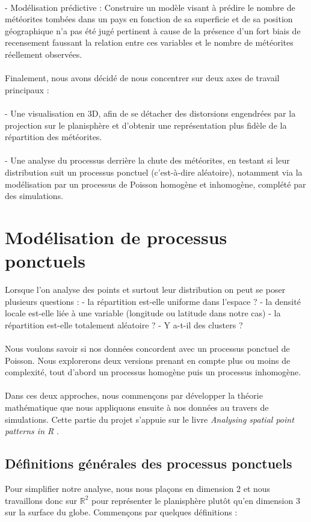 \documentclass[12pt]{article}
\newcommand{\R}{\mathbb{R}}
\begin{document}
\\
- Modélisation prédictive : Construire un modèle visant à prédire le nombre de météorites tombées dans un pays en fonction de sa superficie et de sa position géographique n’a pas été jugé pertinent à cause de la présence d’un fort biais de recensement faussant la relation entre ces variables et le nombre de météorites réellement observées.\\
\\
Finalement, nous avons décidé de nous concentrer sur deux axes de travail principaux :\\
\\
- Une visualisation en 3D, afin de se détacher des distorsions engendrées par la projection sur le planisphère et d’obtenir une représentation plus fidèle de la répartition des météorites.\\
\\
- Une analyse du processus derrière la chute des météorites, en testant si leur distribution suit un processus ponctuel (c’est-à-dire aléatoire), notamment via la modélisation par un processus de Poisson homogène et inhomogène, complété par des simulations.

\section{Modélisation de processus ponctuels}
Lorsque l'on analyse des points et surtout leur distribution on peut se poser plusieurs questions :
- la répartition est-elle uniforme dans l'espace ?
- la densité locale est-elle liée à une variable (longitude ou latitude dans notre cas)
- la répartition est-elle totalement aléatoire ?
- Y a-t-il des clusters ?\\
\\
Nous voulons savoir si nos données concordent avec un processus ponctuel de Poisson. Nous explorerons deux versions prenant en compte plus ou moins de complexité, tout d'abord un processus homogène puis un processus inhomogène.\\
\\
Dans ces deux approches, nous commençons par développer la théorie mathématique que nous appliquons ensuite à nos données au travers de simulations. Cette partie du projet s'appuie sur le livre \textit{Analysing spatial point patterns in R} \cite{analysing_spacial_points}.

\subsection{Définitions générales des processus ponctuels}
Pour simplifier notre analyse, nous nous plaçons en dimension 2 et nous travaillons donc sur $\R^2$ pour représenter le planisphère plutôt qu'en dimension 3 sur la surface du globe. Commençons par quelques définitions :
\end{document}
